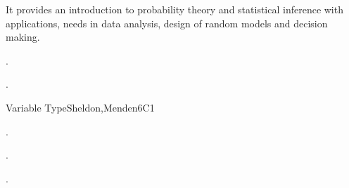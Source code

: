 
\begin{syllabus}


\begin{justification}
It provides an introduction to probability theory and statistical inference with applications, needs in data analysis, design of random models and decision making.
\end{justification}

\begin{goals}
\item . %
\item . %
\end{goals}

\begin{outcomes}
   \item {}
   \item {}
   \item {}
\end{outcomes}

\begin{competences}
    \item {} 
    \item {}
    \item {}
\end{competences}


\begin{unit}{Variable Type}{}{Sheldon,Menden}{6}{C1}
\begin{topics}
      \item . %
   \end{topics}

   \begin{learningoutcomes}
      \item . %
      \item . %
   \end{learningoutcomes}
\end{unit}


\end{syllabus}
